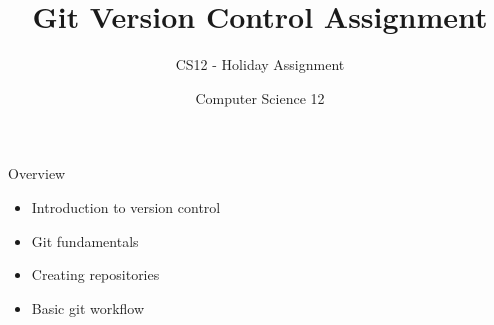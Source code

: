 \documentclass[10pt]{beamer}
\title{Git Version Control Assignment}
\subtitle{CS12 - Holiday Assignment}
\author{Computer Science 12}
\date{}
\begin{document}
\begin{frame}
    \titlepage
\end{frame}

\begin{frame}{Overview}
    \begin{itemize}
        \item Introduction to version control
        \item Git fundamentals
        \item Creating repositories
        \item Basic git workflow
    \end{itemize}
\end{frame}

\end{document}
